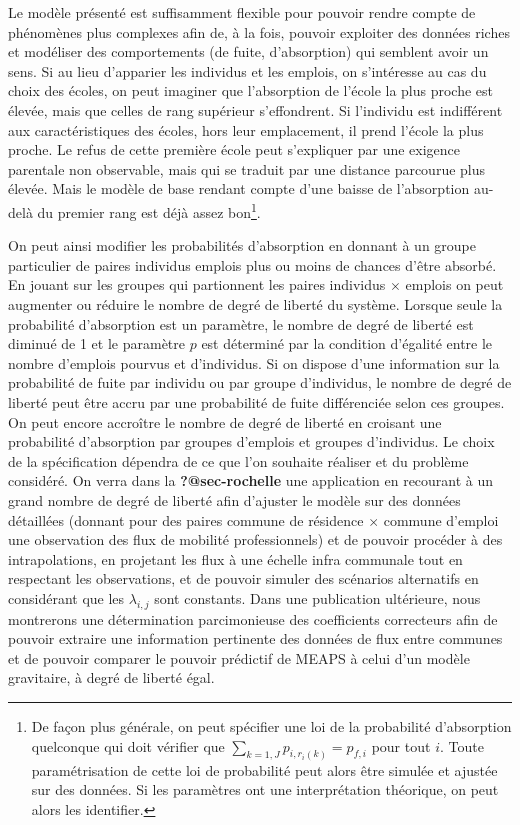 \documentclass[
  10pt,
  a4paper,
  numbers=noendperiod,
  DIV=9]{scrreprt}
\begin{document}
Le modèle présenté est suffisamment flexible pour pouvoir rendre compte
de phénomènes plus complexes afin de, à la fois, pouvoir exploiter des
données riches et modéliser des comportements (de fuite, d'absorption)
qui semblent avoir un sens. Si au lieu d'apparier les individus et les
emplois, on s'intéresse au cas du choix des écoles, on peut imaginer que
l'absorption de l'école la plus proche est élevée, mais que celles de
rang supérieur s'effondrent. Si l'individu est indifférent aux
caractéristiques des écoles, hors leur emplacement, il prend l'école la
plus proche. Le refus de cette première école peut s'expliquer par une
exigence parentale non observable, mais qui se traduit par une distance
parcourue plus élevée. Mais le modèle de base rendant compte d'une
baisse de l'absorption au-delà du premier rang est déjà assez
bon\footnote{De façon plus générale, on peut spécifier une loi de la
  probabilité d'absorption quelconque qui doit vérifier que
  \(\sum_{k=1,J} p_{i,r_i(k)} = p_{f,i}\) pour tout \(i\). Toute
  paramétrisation de cette loi de probabilité peut alors être simulée et
  ajustée sur des données. Si les paramètres ont une interprétation
  théorique, on peut alors les identifier.}.

On peut ainsi modifier les probabilités d'absorption en donnant à un
groupe particulier de paires individus emplois plus ou moins de chances
d'être absorbé. En jouant sur les groupes qui partionnent les paires
individus \(\times\) emplois on peut augmenter ou réduire le nombre de
degré de liberté du système. Lorsque seule la probabilité d'absorption
est un paramètre, le nombre de degré de liberté est diminué de 1 et le
paramètre \(p\) est déterminé par la condition d'égalité entre le nombre
d'emplois pourvus et d'individus. Si on dispose d'une information sur la
probabilité de fuite par individu ou par groupe d'individus, le nombre
de degré de liberté peut être accru par une probabilité de fuite
différenciée selon ces groupes. On peut encore accroître le nombre de
degré de liberté en croisant une probabilité d'absorption par groupes
d'emplois et groupes d'individus. Le choix de la spécification dépendra
de ce que l'on souhaite réaliser et du problème considéré. On verra dans
la \textbf{?@sec-rochelle} une application en recourant à un grand
nombre de degré de liberté afin d'ajuster le modèle sur des données
détaillées (donnant pour des paires commune de résidence \(\times\)
commune d'emploi une observation des flux de mobilité professionnels) et
de pouvoir procéder à des intrapolations, en projetant les flux à une
échelle infra communale tout en respectant les observations, et de
pouvoir simuler des scénarios alternatifs en considérant que les
\(\lambda_{i,j}\) sont constants. Dans une publication ultérieure, nous
montrerons une détermination parcimonieuse des coefficients correcteurs
afin de pouvoir extraire une information pertinente des données de flux
entre communes et de pouvoir comparer le pouvoir prédictif de MEAPS à
celui d'un modèle gravitaire, à degré de liberté égal.
\end{document}
